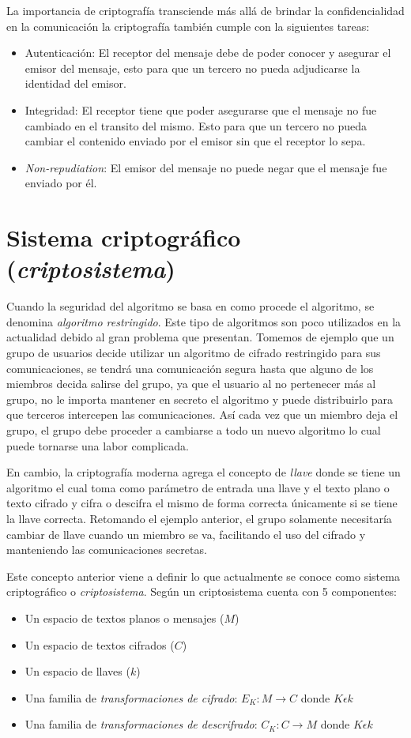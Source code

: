 La importancia de criptografía transciende más allá de brindar la confidencialidad en la comunicación la criptografía también cumple con la siguientes tareas:
\begin{itemize}
\item Autenticación: El receptor del mensaje debe de poder conocer y asegurar el emisor del mensaje, esto para que un tercero no pueda adjudicarse la identidad del emisor.
\item Integridad: El receptor tiene que poder asegurarse que el mensaje no fue cambiado en el transito del mismo. Esto para que un tercero no pueda cambiar el contenido enviado por el emisor sin que el receptor lo sepa.
\item \textit{Non-repudiation}: El emisor del mensaje no puede negar que el mensaje fue enviado por él. 
\end{itemize}

\section{Sistema criptográfico (\textit{criptosistema})}
Cuando la seguridad del algoritmo se basa en como procede el algoritmo, se denomina \textit{algoritmo restringido}. Este tipo de algoritmos son poco utilizados en la actualidad debido al gran problema que presentan. Tomemos de ejemplo que un grupo de usuarios decide utilizar un algoritmo de cifrado restringido para sus comunicaciones, se tendrá una comunicación segura hasta que alguno de los miembros decida salirse del grupo, ya que el usuario al no pertenecer más al grupo, no le importa mantener en secreto el algoritmo y puede distribuirlo para que terceros intercepen las comunicaciones. Así cada vez que un miembro deja el grupo, el grupo debe proceder a cambiarse a todo un nuevo algoritmo lo cual puede tornarse una labor complicada.

En cambio, la criptografía moderna \cite{denning} agrega el concepto de \textit{llave} donde se tiene un algoritmo el cual toma como parámetro de entrada una llave y el texto plano o texto cifrado y cifra o descifra el mismo de forma correcta únicamente si se tiene la llave correcta. Retomando el ejemplo anterior, el grupo solamente necesitaría cambiar de llave cuando un miembro se va, facilitando el uso del cifrado y manteniendo las comunicaciones secretas.

Este concepto anterior viene a definir lo que actualmente se conoce como sistema criptográfico o \textit{criptosistema}. Según \cite{denning} un criptosistema cuenta con 5 componentes:
\begin{itemize}
\item Un espacio de textos planos o mensajes ($M$)
\item Un espacio de textos cifrados ($C$)
\item Un espacio de llaves ($k$)
\item Una familia de \textit{transformaciones de cifrado}: $E_K: M\rightarrow C$ donde $K \epsilon  k$
\item Una familia de \textit{transformaciones de descrifrado}: $C_K: C\rightarrow M$ donde $K \epsilon  k$
\end{itemize} 


